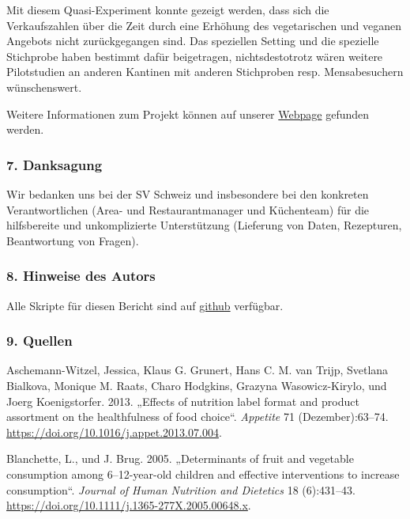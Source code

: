 \documentclass[12pt,ngerman,]{article}
\begin{document}
\par

Mit diesem Quasi-Experiment konnte gezeigt werden, dass sich die
Verkaufszahlen über die Zeit durch eine Erhöhung des vegetarischen und
veganen Angebots nicht zurückgegangen sind. Das speziellen Setting und
die spezielle Stichprobe haben bestimmt dafür beigetragen,
nichtsdestotrotz wären weitere Pilotstudien an anderen Kantinen mit
anderen Stichproben resp. Mensabesuchern wünschenswert.

Weitere Informationen zum Projekt können auf unserer
\href{novanimal.ch}{Webpage} gefunden werden.

\hypertarget{danksagung}{%
\subsubsection{7. Danksagung}\label{danksagung}}

Wir bedanken uns bei der SV Schweiz und insbesondere bei den konkreten
Verantwortlichen (Area- und Restaurantmanager und Küchenteam) für die
hilfsbereite und unkomplizierte Unterstützung (Lieferung von Daten,
Rezepturen, Beantwortung von Fragen).

\hypertarget{hinweise-des-autors}{%
\subsubsection{8. Hinweise des Autors}\label{hinweise-des-autors}}

Alle Skripte für diesen Bericht sind auf
\href{https://github.com/GAEgeler/tilldata_2017}{github} verfügbar.

\hypertarget{quellen}{%
\subsubsection*{9. Quellen}\label{quellen}}

\hypertarget{refs}{}
\leavevmode\hypertarget{ref-aschemann-witzel_effects_2013}{}%
Aschemann-Witzel, Jessica, Klaus G. Grunert, Hans C. M. van Trijp,
Svetlana Bialkova, Monique M. Raats, Charo Hodgkins, Grazyna
Wasowicz-Kirylo, und Joerg Koenigstorfer. 2013. „Effects of nutrition
label format and product assortment on the healthfulness of food
choice``. \emph{Appetite} 71 (Dezember):63--74.
\url{https://doi.org/10.1016/j.appet.2013.07.004}.

\leavevmode\hypertarget{ref-blanchette_determinants_2005}{}%
Blanchette, L., und J. Brug. 2005. „Determinants of fruit and vegetable
consumption among 6--12-year-old children and effective interventions to
increase consumption``. \emph{Journal of Human Nutrition and Dietetics}
18 (6):431--43. \url{https://doi.org/10.1111/j.1365-277X.2005.00648.x}.
\end{document}
